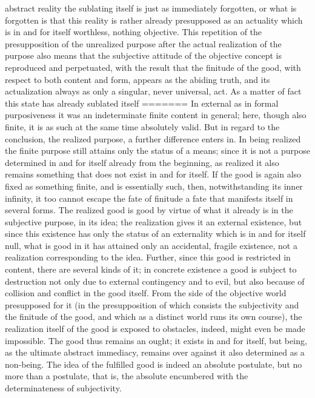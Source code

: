 abstract reality the sublating itself is just as immediately forgotten, or what
is forgotten is that this reality is rather already presupposed as an actuality
which is in and for itself worthless, nothing objective. This repetition of
the presupposition of the unrealized purpose after the actual realization of
the purpose also means that the subjective attitude of the objective concept
is reproduced and perpetuated, with the result that the finitude of the good,
with respect to both content and form, appears as the abiding truth, and
its actualization always as only a singular, never universal, act.
As a matter of fact this state has already sublated itself
=======
In external as in formal purposiveness
it was an indeterminate finite content in general;
here, though also finite,
it is as such at the same time absolutely valid.
But in regard to the conclusion, the realized purpose,
a further difference enters in.
In being realized the finite purpose still attains
only the status of a means;
since it is not a purpose determined in and for itself
already from the beginning,
as realized it also remains something that does not
exist in and for itself.
If the good is again also fixed as something finite,
and is essentially such, then,
notwithstanding its inner infinity,
it too cannot escape the fate of finitude
a fate that manifests itself in several forms.
The realized good is good by virtue of what
it already is in the subjective purpose, in its idea;
the realization gives it an external existence,
but since this existence has only the status of
an externality which is in and for itself null,
what is good in it has attained only
an accidental, fragile existence,
not a realization corresponding to the idea.
Further, since this good is restricted in content,
there are several kinds of it;
in concrete existence a good is subject to
destruction not only due to external contingency and to evil,
but also because of collision and conflict in the good itself.
From the side of the objective world presupposed for it
(in the presupposition of which consists
the subjectivity and the finitude of the good,
and which as a distinct world runs its own course),
the realization itself of the good
is exposed to obstacles, indeed,
might even be made impossible.
The good thus remains an ought;
it exists in and for itself,
but being, as the ultimate abstract immediacy,
remains over against it also determined as a non-being.
The idea of the fulfilled good is
indeed an absolute postulate,
but no more than a postulate, that is,
the absolute encumbered with
the determinateness of subjectivity.
